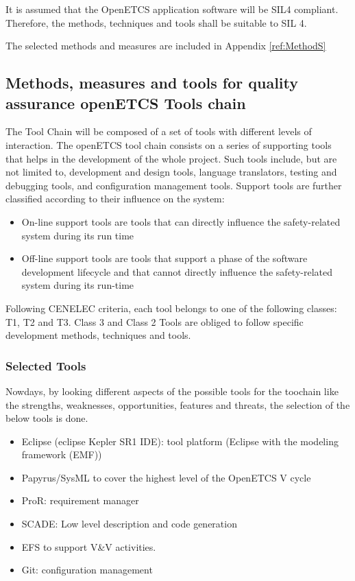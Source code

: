 \documentclass{template/openetcs_article}
\begin{document}
It is assumed that the OpenETCS application software will be \gls{SIL}4 compliant. Therefore, the methods, techniques and tools shall be suitable to \gls{SIL} 4. 

The selected methods and measures are included in Appendix  \ref{ref:MethodS}

\subsection{Methods, measures and tools for quality assurance openETCS Tools chain}

The Tool Chain will be composed of a set of tools with different levels of interaction. The openETCS tool chain consists on a series of supporting tools that helps in the development of the whole project. Such tools include, but are not limited to, development and design tools, language translators, testing and debugging tools, and configuration management tools. Support tools are further classified according to their influence on the system:
\begin{itemize}
\item On-line support tools are tools that can directly influence the safety-related system during its run time
\item Off-line support tools are tools that support a phase of the software development lifecycle and that cannot directly influence the safety-related system during its run-time
\end{itemize}

Following CENELEC criteria, each tool belongs to one of the following classes: T1, T2 and T3. Class 3 and Class 2 Tools are obliged to follow specific development methods, techniques and tools. 


\subsubsection{Selected Tools}
Nowdays, by looking different aspects of the possible tools for the toochain like the strengths, weaknesses, opportunities, features and threats, the selection of the below tools is done.

\begin{itemize}
\item Eclipse (eclipse Kepler SR1 IDE): tool platform (Eclipse with the modeling framework (EMF))
\item Papyrus/SysML to cover the highest level of the OpenETCS V cycle
\item ProR: requirement manager
\item SCADE: Low level description and code generation
\item EFS to support V\&V activities.
\item Git: configuration management
\end{itemize}
\end{document}
